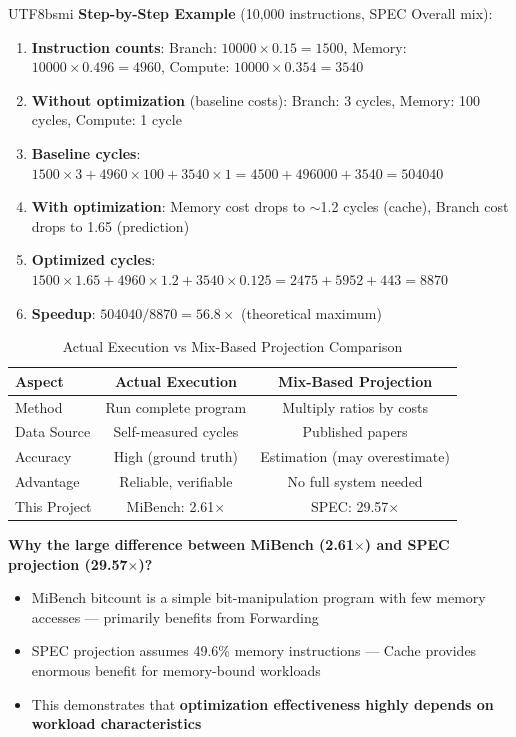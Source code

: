 \documentclass[journal,twoside]{IEEEtran}
\begin{document}
\begin{CJK}{UTF8}{bsmi}
\textbf{Step-by-Step Example} (10,000 instructions, SPEC Overall mix):
\begin{enumerate}
    \item \textbf{Instruction counts}: Branch: $10000 \times 0.15 = 1500$, Memory: $10000 \times 0.496 = 4960$, Compute: $10000 \times 0.354 = 3540$
    \item \textbf{Without optimization} (baseline costs): Branch: 3 cycles, Memory: 100 cycles, Compute: 1 cycle
    \item \textbf{Baseline cycles}: $1500 \times 3 + 4960 \times 100 + 3540 \times 1 = 4500 + 496000 + 3540 = 504040$
    \item \textbf{With optimization}: Memory cost drops to $\sim$1.2 cycles (cache), Branch cost drops to 1.65 (prediction)
    \item \textbf{Optimized cycles}: $1500 \times 1.65 + 4960 \times 1.2 + 3540 \times 0.125 = 2475 + 5952 + 443 = 8870$
    \item \textbf{Speedup}: $504040 / 8870 = 56.8\times$ (theoretical maximum)
\end{enumerate}

\begin{table}[!t]
\centering
\caption{Actual Execution vs Mix-Based Projection Comparison}
\label{tab:comparison}
\footnotesize
\begin{tabular}{@{}lcc@{}}
\toprule
\textbf{Aspect} & \textbf{Actual Execution} & \textbf{Mix-Based Projection} \\
\midrule
Method & Run complete program & Multiply ratios by costs \\
Data Source & Self-measured cycles & Published papers \\
Accuracy & High (ground truth) & Estimation (may overestimate) \\
Advantage & Reliable, verifiable & No full system needed \\
This Project & MiBench: 2.61$\times$ & SPEC: 29.57$\times$ \\
\bottomrule
\end{tabular}
\end{table}

\textbf{Why the large difference between MiBench (2.61$\times$) and SPEC projection (29.57$\times$)?}
\begin{itemize}
    \item MiBench bitcount is a simple bit-manipulation program with few memory accesses --- primarily benefits from Forwarding
    \item SPEC projection assumes 49.6\% memory instructions --- Cache provides enormous benefit for memory-bound workloads
    \item This demonstrates that \textbf{optimization effectiveness highly depends on workload characteristics}
\end{itemize}


\end{CJK}
\end{document}
